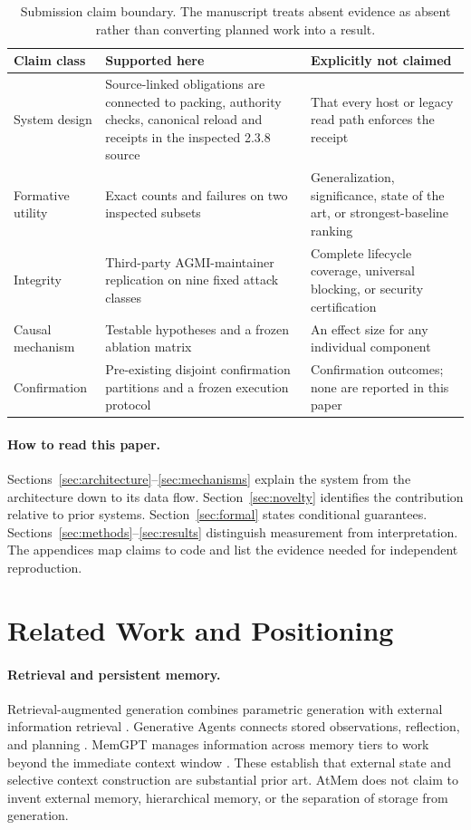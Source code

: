 \documentclass[10pt,twocolumn]{article}
\begin{document}
\begin{table}[t]
\centering\small
\begin{tabularx}{\linewidth}{p{.26\linewidth}YY}
\toprule
Claim class & Supported here & Explicitly not claimed\\\midrule
System design & Source-linked obligations are connected to packing, authority checks, canonical reload and receipts in the inspected 2.3.8 source & That every host or legacy read path enforces the receipt\\
Formative utility & Exact counts and failures on two inspected subsets & Generalization, significance, state of the art, or strongest-baseline ranking\\
Integrity & Third-party AGMI-maintainer replication on nine fixed attack classes & Complete lifecycle coverage, universal blocking, or security certification\\
Causal mechanism & Testable hypotheses and a frozen ablation matrix & An effect size for any individual component\\
Confirmation & Pre-existing disjoint confirmation partitions and a frozen execution protocol & Confirmation outcomes; none are reported in this paper\\\bottomrule
\end{tabularx}
\caption{Submission claim boundary. The manuscript treats absent evidence as absent rather than converting planned work into a result.}
\label{tab:claims}
\end{table}

\paragraph{How to read this paper.}
Sections~\ref{sec:architecture}--\ref{sec:mechanisms} explain the system from the architecture down to its data flow. Section~\ref{sec:novelty} identifies the contribution relative to prior systems. Section~\ref{sec:formal} states conditional guarantees. Sections~\ref{sec:methods}--\ref{sec:results} distinguish measurement from interpretation. The appendices map claims to code and list the evidence needed for independent reproduction.

\section{Related Work and Positioning}
\paragraph{Retrieval and persistent memory.}
Retrieval-augmented generation combines parametric generation with external information retrieval \citep{rag}. Generative Agents connects stored observations, reflection, and planning \citep{generative}. MemGPT manages information across memory tiers to work beyond the immediate context window \citep{memgpt}. These establish that external state and selective context construction are substantial prior art. AtMem does not claim to invent external memory, hierarchical memory, or the separation of storage from generation.
\end{document}
